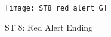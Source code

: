 \begin{figure}
\center
\texttt{[image: ST8\_red\_alert\_G]}
	\caption{ST 8: Red Alert Ending}
	\label{ST8_red_alert_G}
\end{figure}


\clearpage


